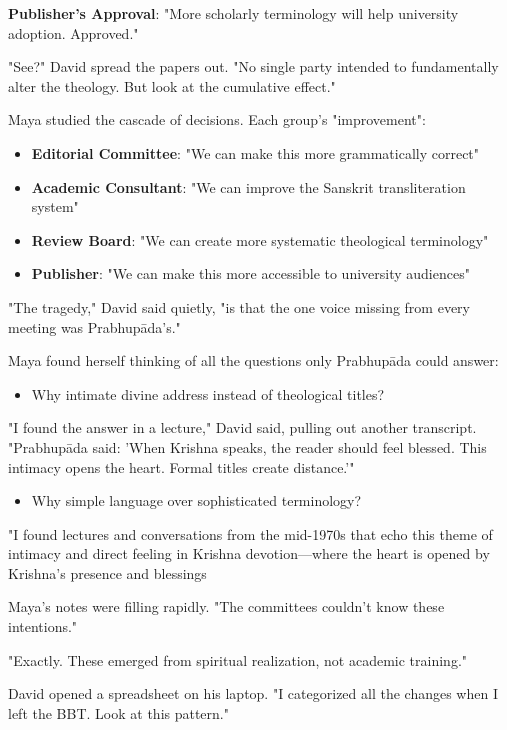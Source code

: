 \documentclass[12pt,twoside]{book}
\begin{document}
\textbf{\textbf{Publisher's Approval}}: "More scholarly terminology will help university adoption. Approved."

"See?" David spread the papers out. "No single party intended to fundamentally alter the theology. But look at the cumulative effect."

Maya studied the cascade of decisions. Each group's "improvement":
\begin{itemize}
\item \textbf{\textbf{Editorial Committee}}: "We can make this more grammatically correct"
\item \textbf{\textbf{Academic Consultant}}: "We can improve the Sanskrit transliteration system"
\item \textbf{\textbf{Review Board}}: "We can create more systematic theological terminology"
\item \textbf{\textbf{Publisher}}: "We can make this more accessible to university audiences"
\end{itemize}

"The tragedy," David said quietly, "is that the one voice missing from every meeting was Prabhupāda's."

Maya found herself thinking of all the questions only Prabhupāda could answer:

\begin{itemize}
\item Why intimate divine address instead of theological titles?
\end{itemize}

"I found the answer in a lecture," David said, pulling out another transcript. "Prabhupāda said: 'When Krishna speaks, the reader should feel blessed. This intimacy opens the heart. Formal titles create distance.'"

\begin{itemize}
\item Why simple language over sophisticated terminology?
\end{itemize}

"I found lectures and conversations from the mid-1970s that echo this theme of intimacy and direct feeling in Krishna devotion—where the heart is opened by Krishna’s presence and blessings

Maya's notes were filling rapidly. "The committees couldn't know these intentions."

"Exactly. These emerged from spiritual realization, not academic training."

David opened a spreadsheet on his laptop. "I categorized all the changes when I left the BBT. Look at this pattern."
\end{document}

